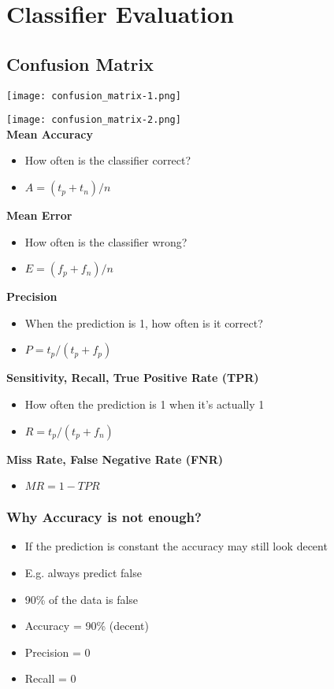 \section{Classifier Evaluation}
\subsection{Confusion Matrix}
\texttt{[image: confusion\_matrix-1.png]}

\texttt{[image: confusion\_matrix-2.png]} \\

\textbf{Mean Accuracy}
\begin{itemize}
    \item How often is the classifier correct?
    \item $A = (t_p + t_n) / n$
\end{itemize}
\vspace{10pt}
\textbf{Mean Error}
\begin{itemize}
    \item How often is the classifier wrong?
    \item $E = (f_p + f_n) / n$
\end{itemize}
\vspace{10pt}
\textbf{Precision}
\begin{itemize}
    \item When the prediction is 1, how often is it correct?
    \item $P = t_p / (t_p + f_p)$
\end{itemize}
\vspace{10pt}
\textbf{Sensitivity, Recall, True Positive Rate (TPR)}
\begin{itemize}
    \item How often the prediction is 1 when it's actually 1
    \item $R = t_p / (t_p + f_n)$
\end{itemize}
\vspace{10pt}
\textbf{Miss Rate, False Negative Rate (FNR)}
\begin{itemize}
    \item $MR = 1 - TPR$
\end{itemize}

\subsubsection{Why Accuracy is not enough?}
\begin{itemize}
    \item If the prediction is constant the accuracy may still look decent
    \item E.g. always predict false
    \item 90\% of the data is false
    \item Accuracy = 90\% (decent)
    \item Precision = 0
    \item Recall = 0
\end{itemize}

